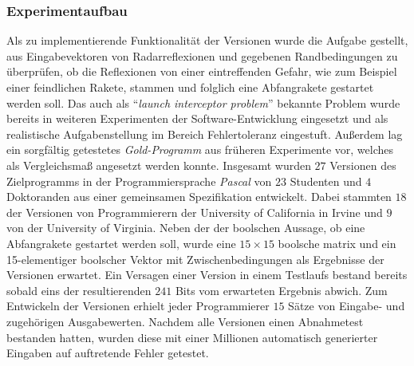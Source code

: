 {\subsubsection{Experimentaufbau}\label{knight-aufbau}
Als zu implementierende Funktionalität der Versionen wurde die Aufgabe gestellt, aus Eingabevektoren von Radarreflexionen und gegebenen Randbedingungen zu überprüfen, ob die Reflexionen von einer eintreffenden Gefahr, wie zum Beispiel einer feindlichen Rakete, stammen und folglich eine Abfangrakete gestartet werden soll. Das auch als \enquote{\emph{launch interceptor problem}} bekannte Problem wurde bereits in weiteren Experimenten der Software-Entwicklung eingesetzt und als realistische Aufgabenstellung im Bereich Fehlertoleranz eingestuft. Außerdem lag ein sorgfältig getestetes \emph{Gold-Programm} aus früheren Experimente vor, welches als Vergleichsmaß angesetzt werden konnte.
Insgesamt wurden $27$ Versionen des Zielprogramms in der Programmiersprache \emph{Pascal} von $23$ Studenten und $4$ Doktoranden aus einer gemeinsamen Spezifikation entwickelt.
Dabei stammten $18$ der Versionen von Programmierern der University of California in Irvine und $9$ von der University of Virginia.
Neben der der boolschen Aussage, ob eine Abfangrakete gestartet werden soll, wurde eine $15 \times 15$ boolsche matrix und ein 15-elementiger boolscher Vektor mit Zwischenbedingungen als Ergebnisse der Versionen erwartet. Ein Versagen einer Version in einem Testlaufs bestand bereits sobald eins der resultierenden $241$ Bits vom erwarteten Ergebnis abwich. Zum Entwickeln der Versionen erhielt jeder Programmierer $15$ Sätze von Eingabe- und zugehörigen Ausgabewerten.
Nachdem alle Versionen einen Abnahmetest bestanden hatten, wurden diese mit einer Millionen automatisch generierter Eingaben auf auftretende Fehler getestet.
%
}
